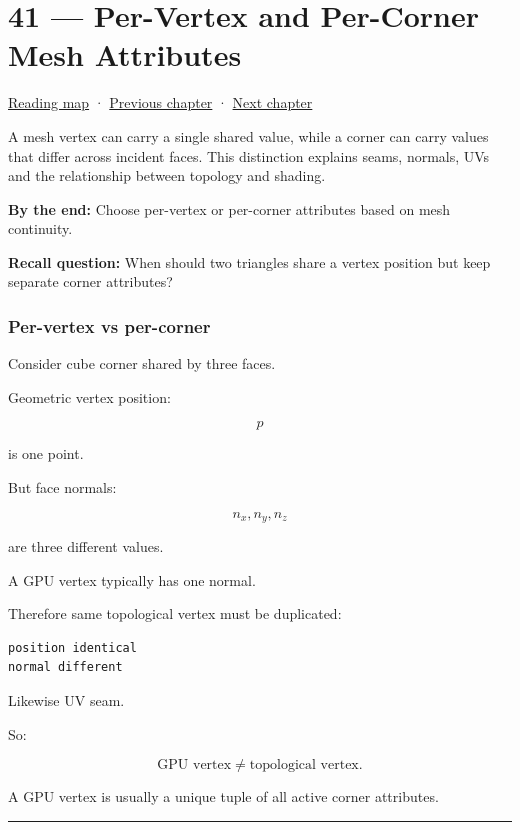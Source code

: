 \hypertarget{04-visual-computing-ii-ch041}{}
\section{41 --- Per-Vertex and Per-Corner Mesh Attributes}\label{per-vertex-and-per-corner-mesh-attributes}

\href{Chapter\%20Edition/02\%20-\%20Graphics\%20Vision\%20and\%20XR/00\%20-\%20Reading\%20Map}{Reading map} · \hyperref[04-visual-computing-ii-ch040]{Previous chapter} · \hyperref[04-visual-computing-ii-ch042]{Next chapter}

A mesh vertex can carry a single shared value, while a corner can carry values that differ across incident faces. This distinction explains seams, normals, UVs and the relationship between topology and shading.

\textbf{By the end:} Choose per-vertex or per-corner attributes based on mesh continuity.

\textbf{Recall question:} When should two triangles share a vertex position but keep separate corner attributes?

\subsubsection{Per-vertex vs per-corner}\label{per-vertex-vs-per-corner}

Consider cube corner shared by three faces.

Geometric vertex position:

\[
p
\]

is one point.

But face normals:

\[
n_x,n_y,n_z
\]

are three different values.

A GPU vertex typically has one normal.

Therefore same topological vertex must be duplicated:

\begin{verbatim}
position identical
normal different
\end{verbatim}

Likewise UV seam.

So:

\[
\boxed{
\text{GPU vertex}
\neq
\text{topological vertex}.
}
\]

A GPU vertex is usually a unique tuple of all active corner attributes.

\begin{center}\rule{0.5\linewidth}{0.5pt}\end{center}

